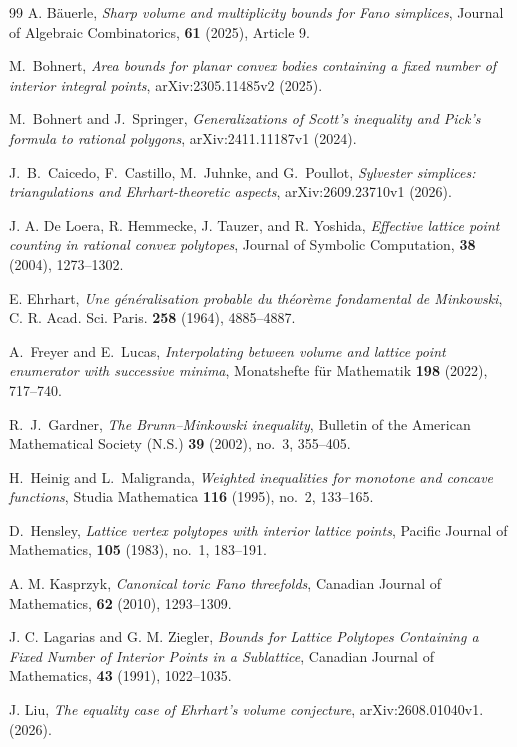 \documentclass[reqno, 11pt]{article}
\numberwithin{equation}{section}
\theoremstyle{definition}
\numberwithin{equation}{section}
\begin{document}
\begin{thebibliography}{99}
 A. B\"auerle, \emph{Sharp volume and multiplicity bounds for Fano simplices}, Journal of Algebraic Combinatorics, \textbf{61} (2025), Article 9.

 M.~Bohnert, \emph{Area bounds for planar convex bodies containing a fixed number of interior integral points}, arXiv:2305.11485v2 (2025).


 M.~Bohnert and J.~Springer, \emph{Generalizations of Scott's inequality and Pick's formula to rational polygons},
arXiv:2411.11187v1 (2024).

 J.~B.~Caicedo, F.~Castillo, M.~Juhnke, and G.~Poullot, \emph{Sylvester simplices: triangulations and Ehrhart-theoretic aspects}, arXiv:2609.23710v1 (2026).

 J. A. De Loera, R. Hemmecke, J. Tauzer, and R. Yoshida, \emph{Effective lattice point counting in rational convex polytopes}, Journal of Symbolic Computation, \textbf{38} (2004), 1273--1302.

 E. Ehrhart, \emph{Une g\'en\'eralisation probable du th\'eor\`eme fondamental de Minkowski}, C. R. Acad. Sci. Paris. \textbf{258} (1964), 4885--4887.

 A.~Freyer and E.~Lucas, \emph{Interpolating between volume and lattice point enumerator with successive minima},
Monatshefte f\"ur Mathematik \textbf{198} (2022), 717--740.


 R.~J.~Gardner, \emph{The Brunn--Minkowski inequality}, Bulletin of the American Mathematical Society (N.S.) \textbf{39} (2002), no.~3, 355--405.


 H.~Heinig and L.~Maligranda, \emph{Weighted inequalities for monotone and concave functions}, Studia Mathematica \textbf{116} (1995), no.~2, 133--165.

 D.~Hensley, \emph{Lattice vertex polytopes with interior lattice points}, Pacific Journal of Mathematics, \textbf{105} (1983), no.~1, 183--191.

 A. M. Kasprzyk, \emph{Canonical toric Fano threefolds}, Canadian Journal of Mathematics, \textbf{62} (2010), 1293--1309.

 J. C. Lagarias and G. M. Ziegler, \emph{Bounds for Lattice Polytopes Containing a Fixed Number of Interior Points in a Sublattice}, Canadian Journal of Mathematics, \textbf{43} (1991), 1022--1035.


 J. Liu, \emph{The equality case of Ehrhart's volume conjecture}, arXiv:2608.01040v1. (2026).


\end{thebibliography}
\end{document}
